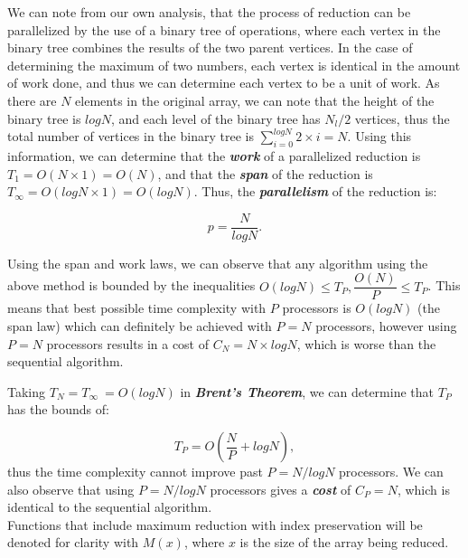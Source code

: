 \documentclass{article}
\begin{document}
We can note from our own analysis, that the process of reduction can be parallelized by the use of a binary tree of operations, where each vertex in the binary tree combines the results of the two parent vertices.
In the case of determining the maximum of two numbers, each vertex is identical in the amount of work done, and thus we can determine each vertex to be a unit of work.
As there are \(N\) elements in the original array, we can note that the height of the binary tree is \(log N\), and each level of the binary tree has \(N_l/2\) vertices, thus the total number of vertices in the binary tree is \(\sum_{i=0}^{log N}{2\times{i}} = N\).
Using this information, we can determine that the \textit{\textbf{work}} of a parallelized reduction is \(T_1 = O(N\times1) = O(N)\), and that the \textit{\textbf{span}} of the reduction is \(T_\infty = O(log N \times {1}) = O(log N)\).
Thus, the \textit{\textbf{parallelism}} of the reduction is:

\[
    p = \dfrac{N}{log N}.
\]

Using the span and work laws, we can observe that any algorithm using the above method is bounded by the inequalities \(O(log N) \leq T_P, \dfrac{O(N)}{P} \leq T_P\).
This means that best possible time complexity with \(P\) processors is \(O(log N)\) (the span law) which can definitely be achieved with \(P=N\) processors, however using \(P=N\) processors results in a cost of \(C_N = N\times{log N}\), which is worse than the sequential algorithm.

Taking \(T_N = T_\infty\ = O(logN)\) in \textit{\textbf{Brent's Theorem}}, we can determine that \(T_P\) has the bounds of:

\[
    T_P = O(\dfrac{N}{P} + log N),
\]
thus the time complexity cannot improve past \(P = N/log N\) processors.
We can also observe that using \(P = N/log N\) processors gives a \textit{\textbf{cost}} of \(C_P = N\), which is identical to the sequential algorithm.
\\

Functions that include maximum reduction with index preservation will be denoted for clarity with \(M(x)\), where \(x\) is the size of the array being reduced.

\printbibliography[
    heading=bibintoc,
    title={Bibliography}
]{}
\end{document}
